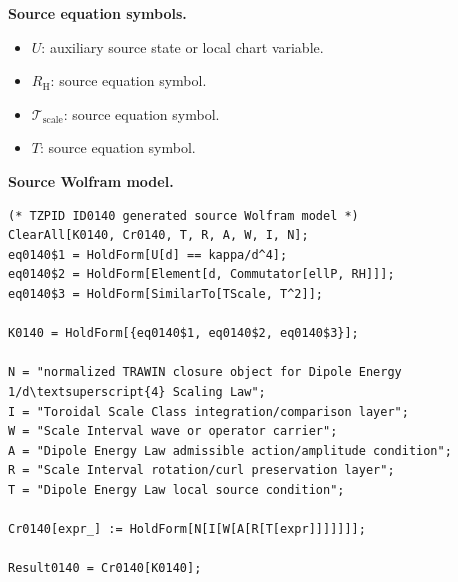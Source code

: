 \begin{minipage}[t]{0.49\linewidth}
\begingroup
\small
\raggedright
\textbf{Source equation symbols.}\par
\begin{itemize}[leftmargin=1.35em,itemsep=1pt,topsep=1pt,parsep=0pt]
    \item $U$: auxiliary source state or local chart variable.
    \item $R_{\mathrm{H}}$: source equation symbol.
    \item $\mathcal{T}_{\mathrm{scale}}$: source equation symbol.
    \item $T$: source equation symbol.
\end{itemize}
\endgroup
\end{minipage}\hfill
\begin{minipage}[t]{0.47\linewidth}
\begingroup
\scriptsize
\raggedright
\textbf{Source Wolfram model.}\par
\begin{Verbatim}[fontsize=\tiny,breaklines=true,breakanywhere=true]
(* TZPID ID0140 generated source Wolfram model *)
ClearAll[K0140, Cr0140, T, R, A, W, I, N];
eq0140$1 = HoldForm[U[d] == kappa/d^4];
eq0140$2 = HoldForm[Element[d, Commutator[ellP, RH]]];
eq0140$3 = HoldForm[SimilarTo[TScale, T^2]];

K0140 = HoldForm[{eq0140$1, eq0140$2, eq0140$3}];

N = "normalized TRAWIN closure object for Dipole Energy 1/d\textsuperscript{4} Scaling Law";
I = "Toroidal Scale Class integration/comparison layer";
W = "Scale Interval wave or operator carrier";
A = "Dipole Energy Law admissible action/amplitude condition";
R = "Scale Interval rotation/curl preservation layer";
T = "Dipole Energy Law local source condition";

Cr0140[expr_] := HoldForm[N[I[W[A[R[T[expr]]]]]]];

Result0140 = Cr0140[K0140];
\end{Verbatim}
\endgroup
\end{minipage}

